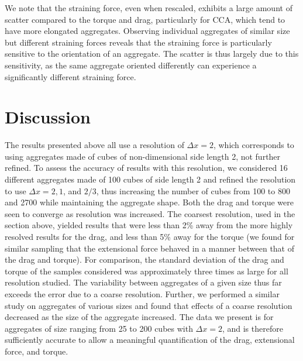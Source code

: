 We note that the straining force, even when rescaled, exhibits a large amount of scatter compared to the torque and drag, particularly for CCA, which tend to have more elongated aggregates. Observing individual aggregates of similar size but different straining forces reveals that the straining force is particularly sensitive to the orientation of an aggregate. The scatter is thus largely due to this sensitivity, as the same aggregate oriented differently can experience a significantly different straining force.

\section{Discussion}
\label{sec:discussion} 

The results presented above all use a resolution of $\Delta x=2$, which corresponds to using aggregates made of cubes of non-dimensional side length 2, not further refined. To assess the accuracy of results with this resolution, we considered 16 different aggregates made of 100 cubes of side length 2 and refined the resolution to use $\Delta x = 2, 1$, and $2/3$, thus increasing the number of cubes from 100 to 800 and 2700 while maintaining the aggregate shape.  
Both the drag and torque were seen to converge as resolution was increased. The coarsest resolution, used in the section above, yielded results that were less than 2\% away from the more highly resolved results for the drag, and less than 5\% away for the torque (we found for similar sampling that the extensional force behaved in a manner between that of the drag and torque).  For comparison, the standard deviation of the drag and torque of the samples considered was approximately three times as large for all resolution studied. The variability between aggregates of a given size thus far exceeds the error due to a coarse resolution. Further, we performed a similar study on aggregates of various sizes and found that effects of a coarse resolution decreased as the size of the aggregate increased. 
The data we present is for aggregates of size ranging from 25 to 200 cubes with $\Delta x=2$, and is therefore sufficiently accurate to allow a meaningful quantification of the drag, extensional force, and torque. 

